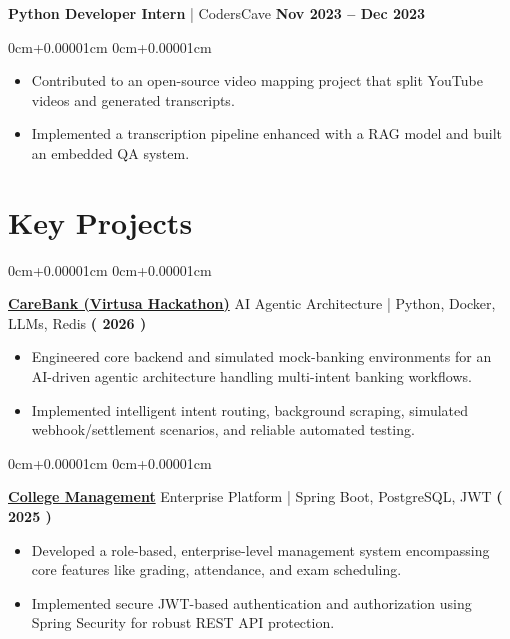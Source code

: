 \documentclass[10pt,a4paper]{article}
\newenvironment{highlights}{
    \begin{itemize}[
        topsep=0.08cm,
        parsep=0.08cm,
        partopsep=0pt,
        itemsep=0pt,
        leftmargin=10pt,
    ]
    }{
    \end{itemize}
}
\newenvironment{onecolentry}{
    \begin{adjustwidth}{
        0cm+0.00001cm
    }{
        0cm+0.00001cm
    }
    }{
    \end{adjustwidth}
}
\begin{document}
    \textbf{Python Developer Intern} | CodersCave \hfill \textbf{Nov 2023 – Dec 2023}
    \begin{onecolentry}
        \begin{highlights}
            \item Contributed to an open-source video mapping project that split YouTube videos and generated transcripts.
            \item Implemented a transcription pipeline enhanced with a RAG model and built an embedded QA system.
        \end{highlights}
    \end{onecolentry}

    \section{Key Projects}\label{sec:projects}
    
    \begin{onecolentry}
        \textbf{\href{https://github.com/Code-Akasha/carebank-backend}{CareBank (Virtusa Hackathon)}} AI Agentic Architecture | Python, Docker, LLMs, Redis \hfill \textbf{( 2026 )} \\
        \begin{highlights}
            \item Engineered core backend and simulated mock-banking environments for an AI-driven agentic architecture handling multi-intent banking workflows.
            \item Implemented intelligent intent routing, background scraping, simulated webhook/settlement scenarios, and reliable automated testing.
        \end{highlights}
    \end{onecolentry}
    
    \begin{onecolentry}
        \textbf{\href{https://github.com/jefino9488/college-management-server}{College Management}} Enterprise Platform | Spring Boot, PostgreSQL, JWT \hfill \textbf{( 2025 )} \\
        \begin{highlights}
            \item Developed a role-based, enterprise-level management system encompassing core features like grading, attendance, and exam scheduling.
            \item Implemented secure JWT-based authentication and authorization using Spring Security for robust REST API protection.
        \end{highlights}
    \end{onecolentry}
\end{document}

